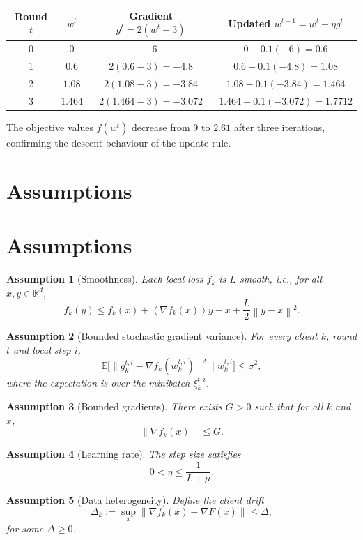 \documentclass{article}
\newcommand{\E}{\mathbb{E}}
\newcommand{\norm}[1]{\left\lVert#1\right\rVert}
\newcommand{\inner}[1]{\left\langle#1\right\rangle}
\newcommand{\R}{\mathbb{R}}
\newtheorem{assumption}{Assumption}
\begin{document}
\begin{center}
\begin{tabular}{c|c|c|c}
\textbf{Round $t$} & $w^{t}$ & Gradient $g^{t}=2(w^{t}-3)$ & Updated $w^{t+1}=w^{t}-\eta g^{t}$ \\ \hline
0 & $0$ & $-6$ & $0-0.1(-6)=0.6$ \\[2mm]
1 & $0.6$ & $2(0.6-3)=-4.8$ & $0.6-0.1(-4.8)=1.08$ \\[2mm]
2 & $1.08$ & $2(1.08-3)=-3.84$ & $1.08-0.1(-3.84)=1.464$ \\[2mm]
3 & $1.464$ & $2(1.464-3)=-3.072$ & $1.464-0.1(-3.072)=1.7712$
\end{tabular}
\end{center}
The objective values $f(w^{t})$ decrease from $9$ to $2.61$ after three
iterations, confirming the descent behaviour of the update rule.

\section*{Assumptions}
\section{Assumptions}
\begin{assumption}[Smoothness]\label{ass:smooth}
Each local loss $f_k$ is $L$‑smooth, i.e., for all $x,y\in\R^{d}$,
\[
f_k(y)\le f_k(x)+\inner{\nabla f_k(x)}{y-x}
            +\frac{L}{2}\norm{y-x}^{2}.
\]
\end{assumption}
\begin{assumption}[Bounded stochastic gradient variance]\label{ass:variance}
For every client $k$, round $t$ and local step $i$,
\[
\E\bigl[\|g_{k}^{t,i}-\nabla f_k(w_{k}^{t,i})\|^{2}\mid w_{k}^{t,i}\bigr]\le\sigma^{2},
\]
where the expectation is over the minibatch $\xi_{k}^{t,i}$.
\end{assumption}
\begin{assumption}[Bounded gradients]\label{ass:bounded-grad}
There exists $G>0$ such that for all $k$ and $x$,
\[
\|\nabla f_k(x)\|\le G.
\]
\end{assumption}
\begin{assumption}[Learning rate]\label{ass:lr}
The step size satisfies
\[
0<\eta\le \frac{1}{L+\mu}.
\]
\end{assumption}
\begin{assumption}[Data heterogeneity]\label{ass:hetero}
Define the client drift
\[
\Delta_k:=\sup_{x}\norm{\nabla f_k(x)-\nabla F(x)}\le \Delta,
\]
for some $\Delta\ge 0$.
\end{assumption}
\end{document}
